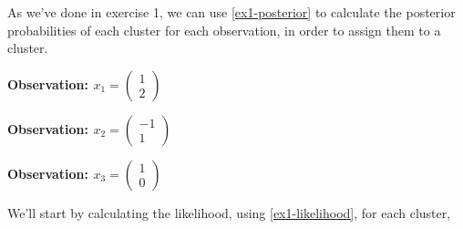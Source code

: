 \documentclass[12pt]{article}
\begin{document}
\begin{enumerate}[leftmargin=\labelsep]
\begin{enumerate}
                    As we've done in exercise 1, we can use \eqref{ex1-posterior} to calculate the
                    posterior probabilities of each cluster for each observation, in order to assign
                    them to a cluster.

                    \vspace*{0.5cm}


          \end{enumerate}

          \begin{paracol}{3}
              \begin{center}
                  \textbf{Observation: \textcolor{cred}{$x_1 = \begin{pmatrix}
                                  1 \\
                                  2
                              \end{pmatrix}$}}
              \end{center}

              \switchcolumn

              \begin{center}
                  \textbf{Observation: \textcolor{cblue}{$x_2 = \begin{pmatrix}
                                  -1 \\
                                  1
                              \end{pmatrix}$}}
              \end{center}

              \switchcolumn

              \begin{center}
                  \textbf{Observation: \textcolor{corange}{$x_3 = \begin{pmatrix}
                                  1 \\
                                  0
                              \end{pmatrix}$}}
              \end{center}

          \end{paracol}

          \begin{center}
              We'll start by calculating the likelihood, using \eqref{ex1-likelihood},
              for each cluster,
          \end{center}


\end{enumerate}
\end{document}
